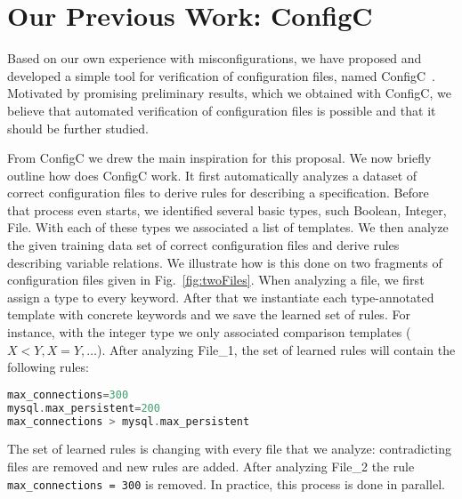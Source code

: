 \section{Our Previous Work: ConfigC}
\label{sec:prelim}

Based on our own experience with misconfigurations,
we have proposed and developed a simple tool for verification of 
configuration files, named
ConfigC~\cite{santolucitoCAV}. Motivated by promising preliminary
results, which we obtained with ConfigC, we believe that automated 
verification of configuration files is possible and that it should be further studied.

From ConfigC we drew the main inspiration for this proposal. We now briefly
outline how does ConfigC work. It first automatically
analyzes a dataset of correct configuration files to derive
 rules for describing a specification. Before that process even starts,
we identified several basic types, 
such Boolean, Integer, File. With each of these types we associated a 
list of templates. We then analyze the given training data set of 
correct configuration files and derive rules describing variable                                                                                                                                                                                                                                                                                                                                                                                                                       
relations. We illustrate how is this done on two fragments of 
configuration files given in Fig.~\ref{fig:twoFiles}.  When analyzing
a file, we first assign a type to every 
keyword. After that we instantiate each type-annotated template with 
concrete keywords and we save the learned set 
of rules. For instance, with the integer type we only associated comparison templates ($X < Y, X = Y, \ldots$). After 
analyzing File\_1, the set of learned rules will contain the following rules:
\begin{lstlisting}[language=C, xleftmargin=.01\textwidth]
max_connections=300
mysql.max_persistent=200
max_connections > mysql.max_persistent
\end{lstlisting}
The set of learned rules is changing with every file that we analyze: contradicting 
files are removed and new rules are added. After analyzing File\_2 the rule \texttt{max\_connections = 300} is removed. In practice, this process is done 
in parallel. 


